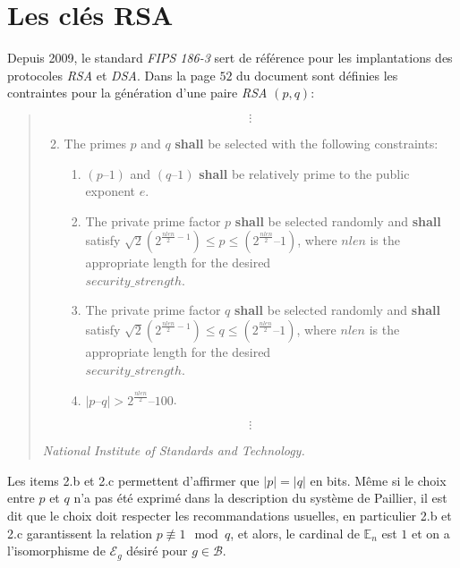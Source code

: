 
	\section{Les clés RSA}
	\label{section:rsa}
	Depuis 2009, le standard \textit{FIPS 186-3} sert de référence pour les implantations des 
	protocoles \textit{RSA} et \textit{DSA}. Dans la page $52$ du document 
	 sont définies les contraintes pour la génération d'une paire \textit{RSA} $(p,q)$:
	\begin{quotation}
	$$\vdots$$
	\begin{enumerate}
	\setcounter{enumi}{1}
		\item The primes $p$ and $q$ \textbf{shall} be selected with the following cons\-train\-ts: 
			\begin{enumerate}
				\item $(p–1)$ and $(q–1)$ \textbf{shall} be relatively prime to the public exponent $e$. 
				\item The private prime factor $p$ \textbf{shall} be selected randomly and \textbf{shall} satisfy 
					$\sqrt{2}(2^{\frac{nlen}{2}-1}) \leq p\leq (2^{\frac{nlen}{2}}– 1)$, where $nlen$
					is the appropriate length for the desired \\$security\_strength$. 
				\item The private prime factor $q$ \textbf{shall} be selected randomly and \textbf{shall} satisfy 
					$\sqrt{2}(2^{\frac{nlen}{2}-1})\leq q\leq (2^{\frac{nlen}{2}}– 1)$, where $nlen$
					is the appropriate length for the desired \\$security\_strength$.
				\item $|p – q| > 2^{\frac{nlen}{2}} – 100$.
			\end{enumerate}
	\end{enumerate}
	$$ \vdots $$

		\hfill \em National Institute of Standards and Technology.\cite{Gallagher09fipspub}
	\end{quotation}

	Les items 2.b et 2.c permettent d'affirmer que $|p| = |q|$ en bits.
	Même si le choix entre $p$ et $q$ n'a pas été exprimé dans la description du système de Paillier, il est dit que 
	le choix doit respecter les recommandations usuelles, en particulier 2.b et 2.c garantissent la relation $p\not\equiv 1\mod{q}$, 
	et alors, le cardinal de $\mathbb{E}_n$ est $1$ et on a l'isomorphisme de $\mathcal{E}_g$ désiré pour $g \in \mathcal{B}$. 
	

